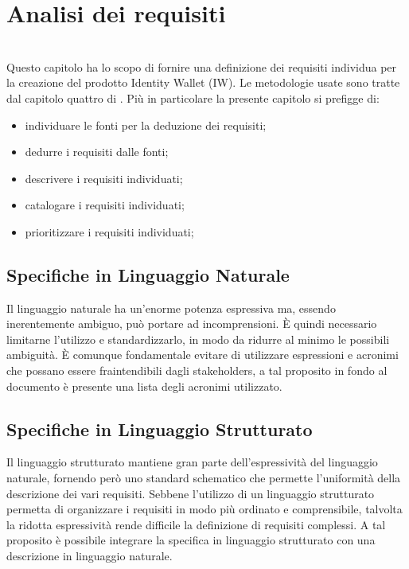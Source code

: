 
\chapter{Analisi dei requisiti}
\label{cap:analisi-requisiti}

\\
Questo capitolo ha lo scopo di fornire una definizione dei requisiti individua per la creazione del prodotto Identity Wallet (IW). Le metodologie usate sono tratte dal capitolo quattro di \cite{som:swe}.
Più in particolare la presente capitolo si prefigge di: 
\begin{itemize}
    \item individuare le fonti per la deduzione dei requisiti; 
    \item dedurre i requisiti dalle fonti; 
    \item descrivere i requisiti individuati; 
    \item catalogare i requisiti individuati; 
    \item prioritizzare i requisiti individuati;
\end{itemize}
\section{Specifiche in Linguaggio Naturale}
Il linguaggio naturale ha un’enorme potenza espressiva ma, essendo inerentemente ambiguo, può portare ad incomprensioni. È quindi necessario limitarne l’utilizzo e standardizzarlo, in modo da ridurre al minimo le possibili ambiguità. È comunque fondamentale evitare di utilizzare espressioni e acronimi che possano essere fraintendibili dagli stakeholders, a tal proposito in fondo al documento è presente una lista degli acronimi utilizzato.
\section{Specifiche in Linguaggio Strutturato}
Il linguaggio strutturato mantiene gran parte dell’espressività del linguaggio naturale, fornendo però uno standard schematico che permette l’uniformità della descrizione dei vari requisiti. Sebbene l’utilizzo di un linguaggio strutturato permetta di organizzare i requisiti in modo più ordinato e comprensibile, talvolta la ridotta espressività rende difficile la definizione di requisiti complessi. A tal proposito è possibile integrare la specifica in linguaggio strutturato con una descrizione in linguaggio naturale.
